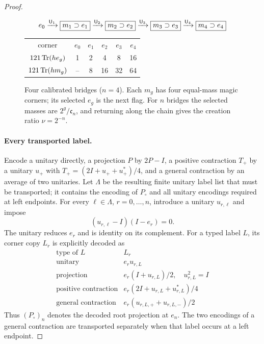 \begin{proof}
\begin{figure}[ht]
\centering\small
\[
 e_0\xrightarrow{{\mathsf U}_1}\boxed{m_1\supset e_1}
 \xrightarrow{{\mathsf U}_2}\boxed{m_2\supset e_2}
 \xrightarrow{{\mathsf U}_3}\boxed{m_3\supset e_3}
 \xrightarrow{{\mathsf U}_4}\boxed{m_4\supset e_4}
\]
\begin{tabular}{@{}c|ccccc@{}}
corner & $e_0$&$e_1$&$e_2$&$e_3$&$e_4$\\
$121\operatorname{Tr}(he_g)$&1&2&4&8&16\\
$121\operatorname{Tr}(hm_g)$&--&8&16&32&64
\end{tabular}
\caption{Four calibrated bridges ($n=4$). Each $m_g$ has four equal-mass magic corners; its selected $e_g$ is the next flag. For $n$ bridges the selected masses are $2^g/\mathfrak c_n$, and returning along the chain gives the creation ratio $\nu=2^{-n}$.}\label{fig:chain}
\end{figure}

\paragraph{Every transported label.}
Encode a unitary directly, a projection $P$ by $2P-I$, a positive contraction $T_+$ by a unitary $u_+$ with $T_+=(2I+u_++u_+^*)/4$, and a general contraction by an average of two unitaries. Let $\Lambda$ be the resulting finite unitary label list that must be transported; it contains the encoding of $P_\circ$ and all unitary encodings required at left endpoints. For every $\ell\in\Lambda$, $r=0,\ldots,n$, introduce a unitary $u_{r,\ell}$ and impose
\begin{equation}\label{eq:supportcopies}
 (u_{r,\ell}-I)(I-e_r)=0.
\end{equation}
The unitary reduces $e_r$ and is identity on its complement. For a typed label $L$, its corner copy $L_r$ is explicitly decoded as
\[
 \begin{array}{c|c}
 \text{type of }L&L_r\\\hline
 \text{unitary}&e_ru_{r,L}\\
 \text{projection}&e_r(I+u_{r,L})/2,\quad u_{r,L}^2=I\\
 \text{positive contraction}&e_r(2I+u_{r,L}+u_{r,L}^*)/4\\
 \text{general contraction}&e_r(u_{r,L,+}+u_{r,L,-})/2
 \end{array}
\]
Thus $(P_{\circ})_n$ denotes the decoded root projection at $e_n$. The two encodings of a general contraction are transported separately when that label occurs at a left endpoint.


\end{proof}
